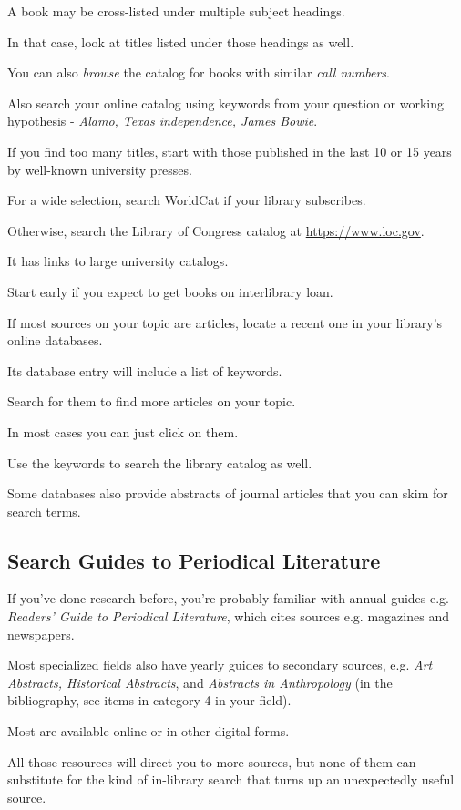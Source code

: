 \documentclass[oneside]{book}
\numberwithin{equation}{section}
\begin{document}
A book may be cross-listed under multiple subject headings.

In that case, look at titles listed under those headings as well.

You can also \textit{browse} the catalog for books with similar \textit{call numbers}.

%
Also search your online catalog using keywords from your question or working hypothesis - \textit{Alamo, Texas independence, James Bowie}.

If you find too many titles, start with those published in the last 10 or 15 years by well-known university presses.

For a wide selection, search WorldCat if your library subscribes.

Otherwise, search the Library of Congress catalog at \url{https://www.loc.gov}.

It has links to large university catalogs.

Start early if you expect to get books on interlibrary loan.

%
If most sources on your topic are articles, locate a recent one in your library's online databases.

Its database entry will include a list of keywords.

Search for them to find more articles on your topic.

In most cases you can just click on them.

Use the keywords to search the library catalog as well.

Some databases also provide abstracts of journal articles that you can skim for search terms.

\subsection{Search Guides to Periodical Literature}
If you've done research before, you're probably familiar with annual guides e.g. \textit{Readers' Guide to Periodical Literature}, which cites sources e.g. magazines and newspapers.

Most specialized fields also have yearly guides to secondary sources, e.g. \textit{Art Abstracts, Historical Abstracts}, and \textit{Abstracts in Anthropology} (in the bibliography, see items in category 4 in your field).

Most are available online or in other digital forms.

%
All those resources will direct you to more sources, but none of them can substitute for the kind of in-library search that turns up an unexpectedly useful source.
\end{document}
